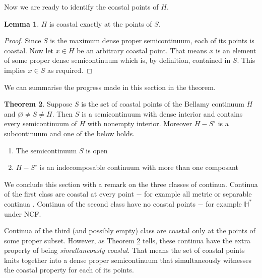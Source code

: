 \documentclass[12pt]{article}
\theoremstyle{plain}
\theoremstyle{definition}
\newtheorem{theorem}{Theorem}[section]
\newtheorem{lemma}[theorem]{Lemma}
\newcommand{\HH}{\ensuremath{\mathbb H}}
\newcommand{\0}{\ensuremath{\varnothing}}
\begin{document}
	Now we are ready to identify the coastal points of $H$.
	
	\begin{lemma} $H$ is coastal exactly at the points of $S$. \end{lemma}
	
	\begin{proof} 
		
		Since $S$ is the maximum dense proper semicontinuum, each of its points is coastal. 
		Now let $x \in H$ be an arbitrary coastal point. That means $x$ is an element of 
		some proper dense semicontinuum which is, by definition, contained in $S$. This implies $x \in S$ as required. \end{proof}
	
	We can summarise the progress made in this section in the theorem.
	
	\begin{theorem} \label{summary}Suppose $S$ is the set of coastal points of the Bellamy continuum $H$ and $\0 \ne S \ne H$. Then $S$ is a semicontinuum with dense interior and contains every semicontinuum of $H$ with nonempty interior. Moreover $H-S^\circ$ is a subcontinuum and one of the below holds.
		\begin{enumerate} 
			\item The semicontinuum $S$ is open
			\item $H-S^\circ$ is an indecomposable continuum with more than one composant
	\end{enumerate}\end{theorem}
	
	We conclude this section with a remark on the three classes of continua. Continua of the first class are coastal at every point $-$ for example all metric or separable continua \cite{me1}. Continua of the second class have no coastal points $-$ for example $\HH^*$ under NCF.
	
	Continua of the third (and possibly empty) class are coastal only at the points of some proper subset. However, as Theorem \ref{summary} tells, these continua have the extra property of being \textit{simultaneously coastal}. That means the set of coastal points knits together into a dense proper semicontinuum that simultaneously witnesses the coastal property for each of its points.
	
\end{document}
